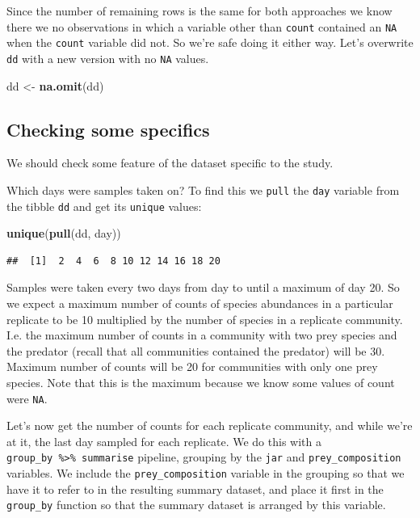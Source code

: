 \documentclass[]{book}
\newenvironment{Shaded}{\begin{snugshade}}{\end{snugshade}}
\newcommand{\KeywordTok}[1]{\textcolor[rgb]{0.13,0.29,0.53}{\textbf{#1}}}
\newcommand{\NormalTok}[1]{#1}
\newcommand{\StringTok}[1]{\textcolor[rgb]{0.31,0.60,0.02}{#1}}
\begin{document}
Since the number of remaining rows is the same for both approaches we know there we no observations in which a variable other than \texttt{count} contained an \texttt{NA} when the \texttt{count} variable did not. So we're safe doing it either way. Let's overwrite \texttt{dd} with a new version with no \texttt{NA} values.

\begin{Shaded}
\begin{Highlighting}[]
\NormalTok{dd <-}\StringTok{ }\KeywordTok{na.omit}\NormalTok{(dd)}
\end{Highlighting}
\end{Shaded}

\hypertarget{checking-some-specifics}{%
\subsection{Checking some specifics}\label{checking-some-specifics}}

We should check some feature of the dataset specific to the study.

Which days were samples taken on? To find this we \texttt{pull} the \texttt{day} variable from the tibble \texttt{dd} and get its \texttt{unique} values:

\begin{Shaded}
\begin{Highlighting}[]
\KeywordTok{unique}\NormalTok{(}\KeywordTok{pull}\NormalTok{(dd, day))}
\end{Highlighting}
\end{Shaded}

\begin{verbatim}
##  [1]  2  4  6  8 10 12 14 16 18 20
\end{verbatim}

Samples were taken every two days from day to until a maximum of day 20. So we expect a maximum number of counts of species abundances in a particular replicate to be 10 multiplied by the number of species in a replicate community. I.e. the maximum number of counts in a community with two prey species and the predator (recall that all communities contained the predator) will be 30. Maximum number of counts will be 20 for communities with only one prey species. Note that this is the maximum because we know some values of count were \texttt{NA}.

Let's now get the number of counts for each replicate community, and while we're at it, the last day sampled for each replicate. We do this with a \texttt{group\_by\ \%\textgreater{}\%\ summarise} pipeline, grouping by the \texttt{jar} and \texttt{prey\_composition} variables. We include the \texttt{prey\_composition} variable in the grouping so that we have it to refer to in the resulting summary dataset, and place it first in the \texttt{group\_by} function so that the summary dataset is arranged by this variable.
\end{document}

